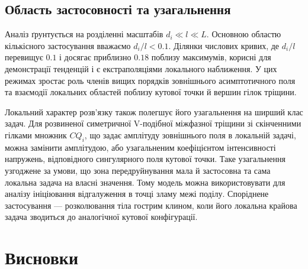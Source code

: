 \subsection{Область застосовності та узагальнення}
\label{subsec:discussion-scope}

Аналіз ґрунтується на розділенні масштабів $d_i\ll l\ll L$. Основною областю кількісного застосування вважаємо $d_i/l<0.1$. Ділянки числових кривих, де $d_i/l$ перевищує $0.1$ і досягає приблизно $0.18$ поблизу максимумів, корисні для демонстрації тенденцій і є екстраполяціями локального наближення. У цих режимах зростає роль членів вищих порядків зовнішнього асимптотичного поля та взаємодії локальних областей поблизу кутової точки й вершин гілок тріщини.

Локальний характер розв’язку також полегшує його узагальнення на ширший клас задач. Для розвиненої симетричної V-подібної міжфазної тріщини зі скінченними гілками множник $CQ_i$, що задає амплітуду зовнішнього поля в локальній задачі, можна замінити амплітудою, або узагальненим коефіцієнтом інтенсивності напружень, відповідного сингулярного поля кутової точки. Таке узагальнення узгоджене за умови, що зона передруйнування мала й застосовна та сама локальна задача на власні значення. Тому модель можна використовувати для аналізу ініціювання відгалуження в точці зламу межі поділу. Споріднене застосування — розколювання тіла гострим клином, коли його локальна крайова задача зводиться до аналогічної кутової конфігурації.

\section{Висновки}
\label{sec:conclusions}

